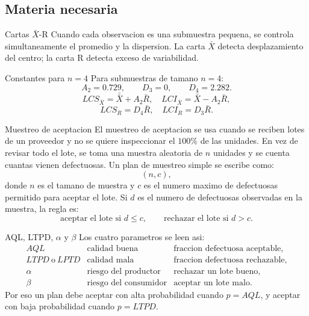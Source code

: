 \subsection{Materia necesaria}

\begin{definicion}{Cartas \(\bar X\)-R}
Cuando cada observacion es una submuestra pequena, se controla simultaneamente el promedio y la dispersion. La carta \(\bar X\) detecta desplazamiento del centro; la carta R detecta exceso de variabilidad.
\end{definicion}

\begin{formulas}{Constantes para \(n=4\)}
Para submuestras de tamano \(n=4\):
\[
A_2=0.729,\qquad D_3=0,\qquad D_4=2.282.
\]
\[
LCS_{\bar X}=\bar{\bar X}+A_2\bar R,\quad
LCI_{\bar X}=\bar{\bar X}-A_2\bar R,
\]
\[
LCS_R=D_4\bar R,\quad LCI_R=D_3\bar R.
\]
\end{formulas}

\begin{definicion}{Muestreo de aceptacion}
El muestreo de aceptacion se usa cuando se reciben lotes de un proveedor y no se quiere inspeccionar el \(100\%\) de las unidades. En vez de revisar todo el lote, se toma una muestra aleatoria de \(n\) unidades y se cuenta cuantas vienen defectuosas. Un plan de muestreo simple se escribe como:
\[
(n,c),
\]
donde \(n\) es el tamano de muestra y \(c\) es el numero maximo de defectuosas permitido para aceptar el lote. Si \(d\) es el numero de defectuosas observadas en la muestra, la regla es:
\[
\text{aceptar el lote si }d\le c,
\qquad
\text{rechazar el lote si }d>c.
\]
\end{definicion}

\begin{definicion}{AQL, LTPD, \(\alpha\) y \(\beta\)}
Los cuatro parametros se leen asi:
\[
\begin{array}{lll}
AQL & \text{calidad buena} & \text{fraccion defectuosa aceptable},\\
LTPD\ \text{o}\ LPTD & \text{calidad mala} & \text{fraccion defectuosa rechazable},\\
\alpha & \text{riesgo del productor} & \text{rechazar un lote bueno},\\
\beta & \text{riesgo del consumidor} & \text{aceptar un lote malo}.
\end{array}
\]
Por eso un plan debe aceptar con alta probabilidad cuando \(p=AQL\), y aceptar con baja probabilidad cuando \(p=LTPD\).
\end{definicion}

